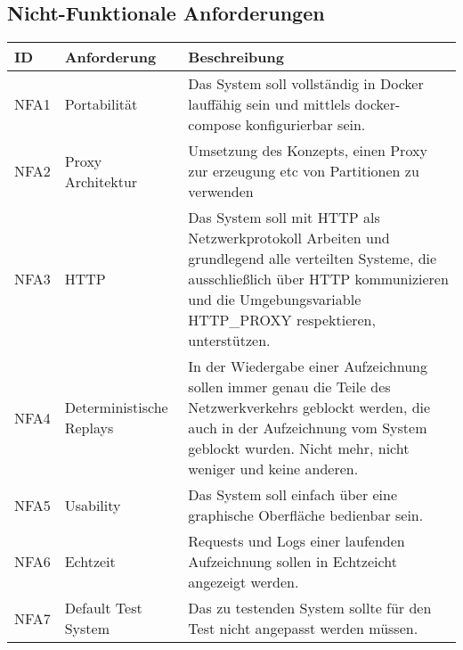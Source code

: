 \documentclass[a4paper]{report}
\begin{document}
\subsection{Nicht-Funktionale Anforderungen}
\begin{table}[h]
	\begin{tabular}{|l|l|p{7cm}|}
		\hline
		ID   & Anforderung              & Beschreibung                                                                                                                                                                                                  \\ \hline
		NFA1 & Portabilität             & Das System soll vollständig in Docker lauffähig sein und mittlels docker-compose konfigurierbar sein.                                                                                                         \\ \hline
		NFA2 & Proxy Architektur        & Umsetzung des Konzepts, einen Proxy zur erzeugung etc von Partitionen zu verwenden                                                                                                                            \\ \hline
		NFA3 & HTTP                     & Das System soll mit HTTP als Netzwerkprotokoll Arbeiten und grundlegend alle verteilten Systeme, die ausschließlich über HTTP kommunizieren und die Umgebungsvariable HTTP\_PROXY respektieren, unterstützen. \\ \hline
		NFA4 & Deterministische Replays & In der Wiedergabe einer Aufzeichnung sollen immer genau die Teile des Netzwerkverkehrs geblockt werden, die auch in der Aufzeichnung vom System geblockt wurden. Nicht mehr, nicht weniger und keine anderen. \\ \hline
		NFA5 & Usability                & Das System soll einfach über eine graphische Oberfläche bedienbar sein.                                                                                                                                       \\ \hline
		NFA6 & Echtzeit                 & Requests und Logs einer laufenden Aufzeichnung sollen in Echtzeicht angezeigt werden.                                                                                                                         \\ \hline
		NFA7 & Default Test System      & Das zu testenden System sollte für den Test nicht angepasst werden müssen.                                                                                                                                    \\ \hline
	\end{tabular}
\end{table}
\end{document}
